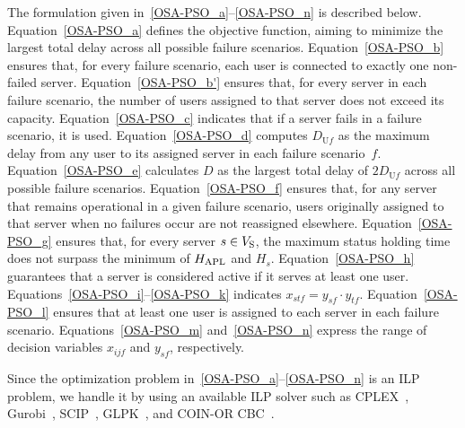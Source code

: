 \documentclass[10pt, letterpaper]{IEEEtran}
\newcommand\magenta[1]{\textcolor{magenta}{#1}}
\begin{document}
\begin{CJK}{UTF8}{ipxm}
The formulation given in~\eqref{OSA-PSO_a}--\eqref{OSA-PSO_n} is described below.
Equation~\eqref{OSA-PSO_a} defines the objective function, aiming to minimize the largest total delay across all possible failure scenarios.
Equation~\eqref{OSA-PSO_b} ensures that, for every failure scenario, each user is connected to exactly one non-failed server.
Equation~\eqref{OSA-PSO_b'} ensures that, for every server in each failure scenario, the number of users assigned to that server does not exceed its capacity.
Equation~\eqref{OSA-PSO_c} indicates that if a server fails in a failure scenario, it is used.
%
Equation~\eqref{OSA-PSO_d} computes $D_{\mathrm{U}f}$ as the maximum delay from any user to its assigned server in each failure scenario~$f$. %
Equation~\eqref{OSA-PSO_e} calculates $D$ as the largest total delay of $2D_{\mathrm{U}f}$ across all possible failure scenarios.
Equation~\eqref{OSA-PSO_f} ensures that, for any server that remains operational in a given failure scenario, users originally assigned to that server when no failures occur are not reassigned elsewhere.
Equation~\eqref{OSA-PSO_g} ensures that, for every server $s \in V_{\rm{S}}$, the maximum status holding time does not surpass the minimum of $H_{\rm APL}$ and $H_s$.
Equation~\eqref{OSA-PSO_h} guarantees that a server is considered active if it serves at least one user.
Equations~\eqref{OSA-PSO_i}--\eqref{OSA-PSO_k} indicates $x_{stf} = y_{sf} \cdot y_{tf}$.
Equation~\eqref{OSA-PSO_l} ensures that at least one user is assigned to each server in each failure scenario. Equations~\eqref{OSA-PSO_m} and~\eqref{OSA-PSO_n} express the range of decision variables $x_{ijf}$ and $y_{sf}$, respectively.

Since the optimization problem in~\eqref{OSA-PSO_a}--\eqref{OSA-PSO_n} is an ILP problem, we handle it by using an available ILP solver such as CPLEX~\cite{CPLEX}, Gurobi~\cite{Gurobi}, SCIP~\cite{SCIP}, GLPK~\cite{GLPK}, and COIN-OR CBC~\cite{CBC}.


\end{CJK}
\end{document}
